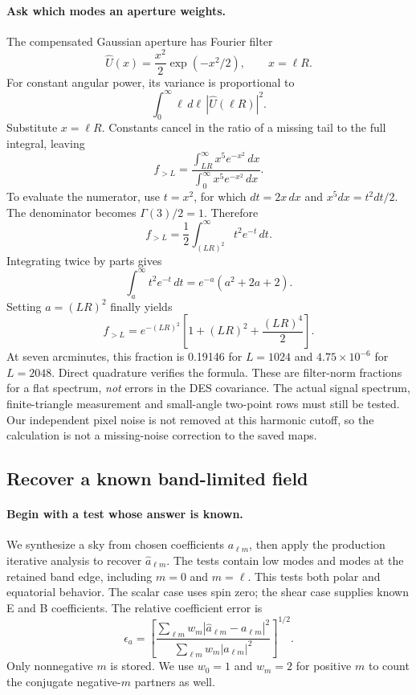 \documentclass[11pt]{article}
\begin{document}
\paragraph{Ask which modes an aperture weights.}
The compensated Gaussian aperture has Fourier filter
\begin{equation}
 \widehat U(x)=\frac{x^2}{2}\exp(-x^2/2),\qquad x=\ell R.
\end{equation}
For constant angular power, its variance is proportional to
\begin{equation}
 \int_0^\infty \ell\,d\ell\,|\widehat U(\ell R)|^2.
\end{equation}
Substitute $x=\ell R$. Constants cancel in the ratio of a missing tail
to the full integral, leaving
\begin{equation}
 f_{>L}=\frac{\int_{LR}^{\infty}x^5e^{-x^2}\,dx}
 {\int_0^{\infty}x^5e^{-x^2}\,dx}.
\end{equation}
To evaluate the numerator, use $t=x^2$, for which $dt=2x\,dx$ and
$x^5dx=t^2dt/2$. The denominator becomes $\Gamma(3)/2=1$. Therefore
\begin{equation}
 f_{>L}=\frac12\int_{(LR)^2}^{\infty}t^2e^{-t}\,dt.
\end{equation}
Integrating twice by parts gives
\begin{equation}
 \int_a^{\infty}t^2e^{-t}\,dt=e^{-a}(a^2+2a+2).
\end{equation}
Setting $a=(LR)^2$ finally yields
\begin{equation}
 f_{>L}=e^{-(LR)^2}\left[1+(LR)^2+\frac{(LR)^4}{2}\right].
\end{equation}
At seven arcminutes, this fraction is 0.19146 for $L=1024$ and
$4.75\times10^{-6}$ for $L=2048$. Direct quadrature verifies the formula.
These are filter-norm fractions for a flat spectrum, \emph{not} errors
in the DES covariance. The actual signal spectrum, finite-triangle
measurement and small-angle two-point rows must still be tested. Our
independent pixel noise is not removed at this harmonic cutoff, so the
calculation is not a missing-noise correction to the saved maps.

\subsection{Recover a known band-limited field}
\paragraph{Begin with a test whose answer is known.}
We synthesize a sky from chosen coefficients $a_{\ell m}$, then apply the
production iterative analysis to recover $\widehat a_{\ell m}$. The tests
contain low modes and modes at the retained band edge, including $m=0$
and $m=\ell$. This tests both polar and equatorial behavior. The scalar
case uses spin zero; the shear case supplies known E and B coefficients.
The relative coefficient error is
\begin{equation}
 \epsilon_a=\left[
 \frac{\sum_{\ell m}w_m|\widehat a_{\ell m}-a_{\ell m}|^2}
 {\sum_{\ell m}w_m|a_{\ell m}|^2}\right]^{1/2}.
\end{equation}
Only nonnegative $m$ is stored. We use $w_0=1$ and $w_m=2$ for positive
$m$ to count the conjugate negative-$m$ partners as well.
\end{document}
